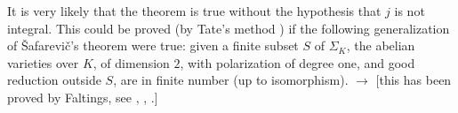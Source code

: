 
It is very likely that the theorem is true without the hypothesis that
$j$ is not integral.  This could be proved (by Tate's method
\cite{tate-endo}) if the following generalization of \v{S}afarevi\v{c}'s
theorem were true: given a finite subset $S$ of $\Sigma_K$, the abelian
varieties over $K$, of dimension $2$, with polarization of degree one,
and good reduction outside $S$, are in finite number (up to isomorphism).
$\longrightarrow$ [this has been proved by Faltings, see
\cite{faltings-endl}, \cite{faltings-wustholz}, \cite{szpiro}.]
